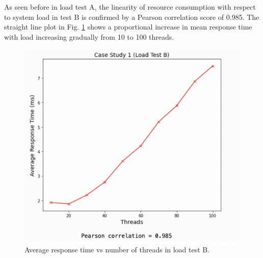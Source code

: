 As seen before in load test A, the linearity of resource consumption with respect to system load in test B is confirmed by a Pearson correlation score of 0.985. The straight line plot in Fig. \ref{fig:cs01-ltb-4} shows a proportional increase in mean response time with load increasing gradually from 10 to 100 threads.

\begin{figure}[H]
  \centering
  \includegraphics[width=0.55\linewidth]{./assets/images/case-studies/cs01-ltb-4.png}
  \caption{Average response time vs number of threads in load test B.}
  \label{fig:cs01-ltb-4}
\end{figure}